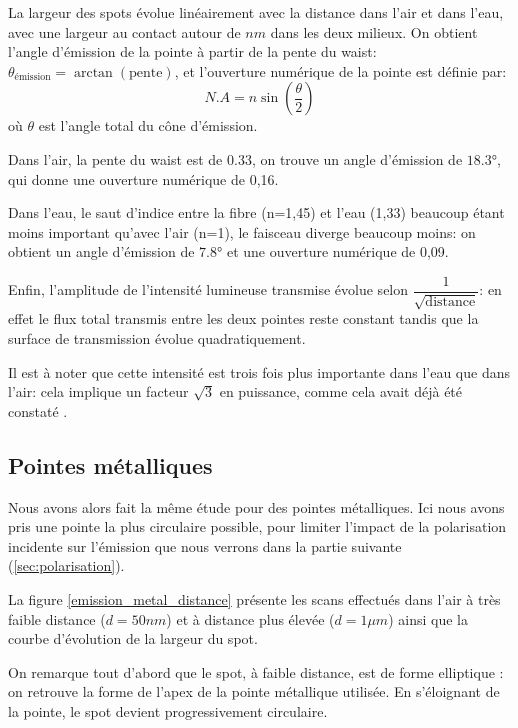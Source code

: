 La largeur des spots évolue linéairement avec la distance dans l'air et dans l'eau, avec une largeur au contact autour de $nm$ dans les deux milieux.
On obtient l'angle d'émission de la pointe à partir de la pente du waist: $\theta_{\text{émission}} = \arctan(\text{pente}) $, et l'ouverture numérique de la pointe est définie par:
\[
    N.A = n\sin(\frac{\theta}{2})
\]
où $\theta$ est l'angle total du cône d'émission.

Dans l'air, la pente du waist est de $0.33$, on trouve un angle d'émission de $18.3\si{\degree}$, qui donne une ouverture numérique de 0,16.

Dans l'eau, le saut d'indice entre la fibre (n=1,45) et l'eau (1,33) beaucoup étant moins important qu'avec l'air (n=1), le faisceau diverge beaucoup moins: on obtient un angle d'émission de $7.8\si{\degree}$ et une ouverture numérique de 0,09.

Enfin, l'amplitude de l'intensité lumineuse transmise évolue selon $\dfrac{1}{\sqrt{\text{distance}}}$: en effet le flux total transmis entre les deux pointes reste constant tandis que la surface de transmission évolue quadratiquement.

Il est à noter que cette intensité est trois fois plus importante dans l'eau que dans l'air: cela implique un facteur $\sqrt{3}$ en puissance, comme cela avait déjà été constaté \cite{Decombe}.


\subsection{Pointes métalliques}
Nous avons alors fait la même étude pour des pointes métalliques. Ici nous avons pris une pointe la plus circulaire possible, pour limiter l'impact de la polarisation incidente sur l'émission que nous verrons dans la partie suivante (\ref{sec:polarisation}).

La figure \ref{emission_metal_distance} présente les scans effectués dans l'air à très faible distance ($d=50nm$) et à distance plus élevée ($d=1\mu m$) ainsi que la courbe d'évolution de la largeur du spot. 

On remarque tout d'abord que le spot, à faible distance, est de forme elliptique : on retrouve la forme de l'apex de la pointe métallique utilisée. En s'éloignant de la pointe, le spot devient progressivement circulaire.

